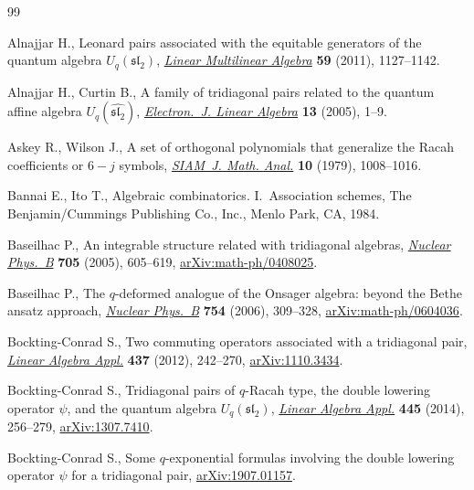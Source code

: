 \documentclass[pdftex]{sigma}
\numberwithin{equation}{section}
\begin{document}
\begin{thebibliography}{99}
\footnotesize\itemsep=0pt

Alnajjar H., Leonard pairs associated with the equitable generators of the
 quantum algebra {$U_q(\mathfrak{sl}_2)$}, \href{https://doi.org/10.1080/03081087.2011.565757}{\textit{Linear Multilinear Algebra}}
 \textbf{59} (2011), 1127--1142.

Alnajjar H., Curtin B., A family of tridiagonal pairs related to the quantum
 affine algebra {$U_q(\widehat{\mathfrak{sl}_2})$}, \href{https://doi.org/10.13001/1081-3810.1147}{\textit{Electron.~J.
 Linear Algebra}} \textbf{13} (2005), 1--9.

Askey R., Wilson J., A set of orthogonal polynomials that generalize the
 {R}acah coefficients or {$6-j$} symbols, \href{https://doi.org/10.1137/0510092}{\textit{SIAM~J. Math. Anal.}}
 \textbf{10} (1979), 1008--1016.

Bannai E., Ito T., Algebraic combinatorics. {I}.~Association schemes, The
 Benjamin/Cummings Publishing Co., Inc., Menlo Park, CA, 1984.

Baseilhac P., An integrable structure related with tridiagonal algebras,
 \href{https://doi.org/10.1016/j.nuclphysb.2004.11.014}{\textit{Nuclear Phys.~B}} \textbf{705} (2005), 605--619,
 \href{https://arxiv.org/abs/math-ph/0408025}{arXiv:math-ph/0408025}.

Baseilhac P., The {$q$}-deformed analogue of the {O}nsager algebra: beyond the
 {B}ethe ansatz approach, \href{https://doi.org/10.1016/j.nuclphysb.2006.08.008}{\textit{Nuclear Phys.~B}} \textbf{754} (2006),
 309--328, \href{https://arxiv.org/abs/math-ph/0604036}{arXiv:math-ph/0604036}.

Bockting-Conrad S., Two commuting operators associated with a tridiagonal pair,
 \href{https://doi.org/10.1016/j.laa.2012.02.007}{\textit{Linear Algebra Appl.}} \textbf{437} (2012), 242--270,
 \href{https://arxiv.org/abs/1110.3434}{arXiv:1110.3434}.

Bockting-Conrad S., Tridiagonal pairs of {$q$}-{R}acah type, the double
 lowering operator {$\psi$}, and the quantum algebra {$U_q(\mathfrak{sl}_2)$},
 \href{https://doi.org/10.1016/j.laa.2013.12.007}{\textit{Linear Algebra Appl.}} \textbf{445} (2014), 256--279,
 \href{https://arxiv.org/abs/1307.7410}{arXiv:1307.7410}.

Bockting-Conrad S., Some $q$-exponential formulas involving the double lowering
 operator $\psi$ for a tridiagonal pair, \href{https://arxiv.org/abs/1907.01157}{arXiv:1907.01157}.


\end{thebibliography}
\end{document}
